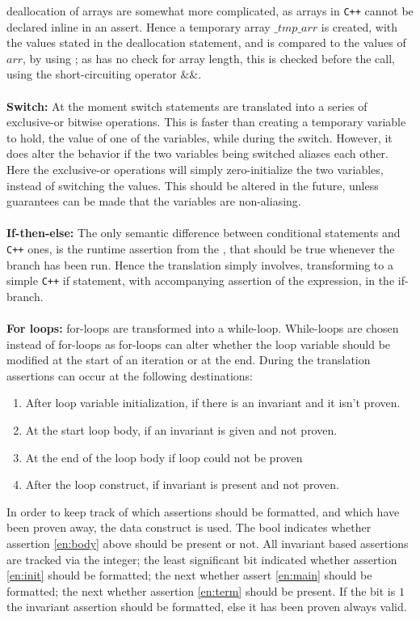deallocation of arrays are somewhat more complicated, as arrays in \texttt{C++} cannot be
declared inline in an assert. Hence a temporary array $\_tmp\_arr$ is created, with the values
stated in the deallocation statement, and is compared to the values of $arr$, by using
; as  has no check for array length, this is checked before the
call, using the short-circuiting operator $\&\&$.
\\
\\
\textbf{Switch:}
At the moment switch statements are translated into a series of exclusive-or bitwise operations.
This is faster than creating a temporary variable to hold, the value of one of the variables, 
while during the switch. However, it does alter the behavior if the two variables being
switched aliases each other. Here the exclusive-or operations will simply zero-initialize
the two variables, instead of switching the values. This should be altered in the future,
unless guarantees can be made that the variables are non-aliasing.
\\
\\
\textbf{If-then-else:}
The only semantic difference between \lan conditional statements and \texttt{C++} ones,
is the runtime assertion from the , that should be true whenever the 
branch has been run. Hence the translation simply involves, transforming to a simple
\texttt{C++} if statement, with accompanying assertion of the  expression, in the
if-branch.
\\
\\
\textbf{For loops:}
\lan for-loops are transformed into a while-loop. While-loops are chosen instead of for-loops
as \lan for-loops can alter whether the loop variable should be modified at the start of an
iteration or at the end. During the translation assertions can occur at the following
destinations:
\begin{enumerate}
      \item \label{en:init} After loop variable initialization, if there is an invariant and it isn't proven.
      \item \label{en:main} At the start loop body, if an invariant is given and not proven.
      \item \label{en:body} At the end of the loop body if loop could not be proven
      \item \label{en:term} After the loop construct, if invariant is present and not proven.
\end{enumerate}
\noindent
In order to keep track of which assertions should be formatted, and which have been proven
away, the data construct  is used. The bool indicates whether
assertion \ref{en:body} above should be present or not. All invariant based assertions are
tracked via the  integer; the least significant bit indicated whether
assertion \ref{en:init} should be formatted; the next whether assert \ref{en:main} should
be formatted; the next whether assertion \ref{en:term} should be present. If the bit is
$1$ the invariant assertion should be formatted, else it has been proven always valid.